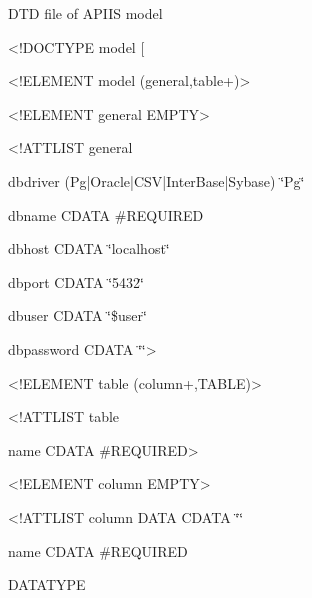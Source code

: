 %
\begin{table}[htbp]

\caption{DTD file of APIIS model \label{DTDfile}}

{\scriptsize <!DOCTYPE model {[}}{\scriptsize \par}

{\scriptsize <!ELEMENT model (general,table+)>}{\scriptsize \par}

{\scriptsize <!ELEMENT general EMPTY>}{\scriptsize \par}

{\scriptsize <!ATTLIST general }{\scriptsize \par}

{\scriptsize dbdriver (Pg|Oracle|CSV|InterBase|Sybase) \char`\"{}Pg\char`\"{}}{\scriptsize \par}

{\scriptsize dbname CDATA \#REQUIRED}{\scriptsize \par}

{\scriptsize dbhost CDATA \char`\"{}localhost\char`\"{}}{\scriptsize \par}

{\scriptsize dbport CDATA \char`\"{}5432\char`\"{}}{\scriptsize \par}

{\scriptsize dbuser CDATA \char`\"{}\$user\char`\"{}}{\scriptsize \par}

{\scriptsize dbpassword CDATA \char`\"{}\char`\"{}>}{\scriptsize \par}

{\scriptsize <!ELEMENT table (column+,TABLE)>}{\scriptsize \par}

{\scriptsize <!ATTLIST table}{\scriptsize \par}

{\scriptsize name CDATA \#REQUIRED>}{\scriptsize \par}

{\scriptsize <!ELEMENT column EMPTY>}{\scriptsize \par}

{\scriptsize <!ATTLIST column DATA CDATA \char`\"{}\char`\"{}}{\scriptsize \par}

{\scriptsize name CDATA \#REQUIRED}{\scriptsize \par}

{\scriptsize DATATYPE}{\scriptsize \par}


\end{table}
